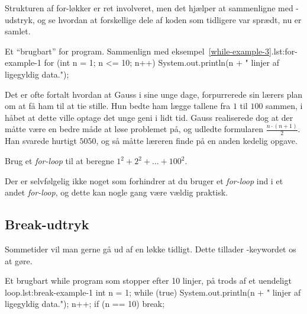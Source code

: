 
		Strukturen af for-løkker er ret involveret, men det hjælper at
		sammenligne med -udstryk, og se hvordan at forskellige
		dele af koden som tidligere var sprædt, nu er samlet.

		\begin{JavaCode}{Et ``brugbart'' for program. Sammenlign med eksempel~\ref{while-example-3}.}{lst:for-example-1}
			for (int n = 1; n <= 10; n++) {
				System.out.println(n + " linjer af ligegyldig data.");
			}
		\end{JavaCode}

		\begin{exercise}
			Det er ofte fortalt hvordan at Gauss i sine unge dage, forpurrerede sin
			lærers plan om at få ham til at tie stille. Hun bedte ham lægge tallene
			fra \(1\) til \(100\) sammen, i håbet at dette ville optage det unge
			geni i lidt tid. Gauss realiserede dog at der måtte være en bedre måde
			at løse problemet på, og udledte formularen \(\frac{n\cdot(n+1)}{2}\).
			Han svarede hurtigt \(5050\), og så måtte læreren finde på en anden
			kedelig opgave.

			Brug et \emph{for-loop} til at beregne \(1^2+2^2+\dots+100^2\).
		\end{exercise}

		\begin{exercise}
			Der er selvfølgelig ikke noget som forhindrer at du bruger et
			\emph{for-loop} ind i et andet \emph{for-loop}, og dette kan nogle gang
			være vældig praktisk.

		\end{exercise}

	\subsection{Break-udtryk}


		Sommetider vil man gerne gå ud af en løkke tidligt. Dette tillader
		-keywordet os at gøre.

		\begin{JavaCode}{Et brugbart while program som stopper efter 10 linjer, på trods af et uendeligt loop.}{lst:break-example-1}
			int n = 1;
			while (true) {
				System.out.println(n + " linjer af ligegyldig data.");
				n++;
				if (n == 10)  break;
			}
		\end{JavaCode}

